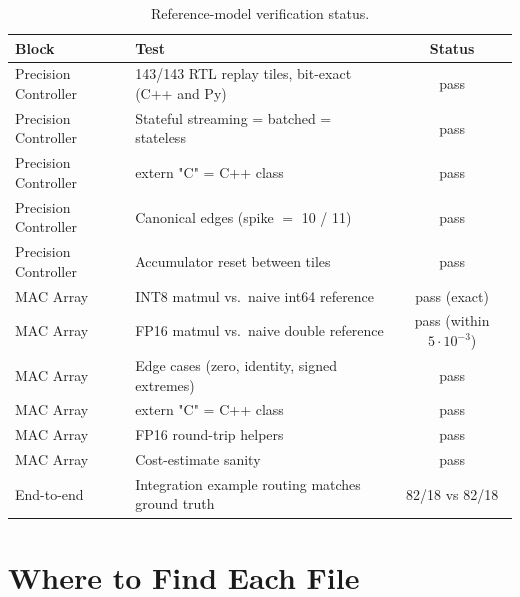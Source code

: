 \documentclass[11pt]{article}
\begin{document}
\begin{table}[ht]
\centering
\small
\caption{Reference-model verification status.}
\label{tab:verif}
\begin{tabular}{@{}l l c@{}}
\toprule
Block                & Test                                                & Status \\
\midrule
Precision Controller & 143/143 RTL replay tiles, bit-exact (C++ and Py)    & pass \\
Precision Controller & Stateful streaming = batched = stateless            & pass \\
Precision Controller & extern "C" = C++ class                              & pass \\
Precision Controller & Canonical edges (spike $=$ 10 / 11)                 & pass \\
Precision Controller & Accumulator reset between tiles                     & pass \\
MAC Array            & INT8 matmul vs.\ naive int64 reference              & pass (exact) \\
MAC Array            & FP16 matmul vs.\ naive double reference             & pass (within $5 \cdot 10^{-3}$) \\
MAC Array            & Edge cases (zero, identity, signed extremes)        & pass \\
MAC Array            & extern "C" = C++ class                              & pass \\
MAC Array            & FP16 round-trip helpers                             & pass \\
MAC Array            & Cost-estimate sanity                                & pass \\
End-to-end           & Integration example routing matches ground truth    & 82/18 vs 82/18 \\
\bottomrule
\end{tabular}
\end{table}

\section{Where to Find Each File}
\label{sec:files}
\end{document}
